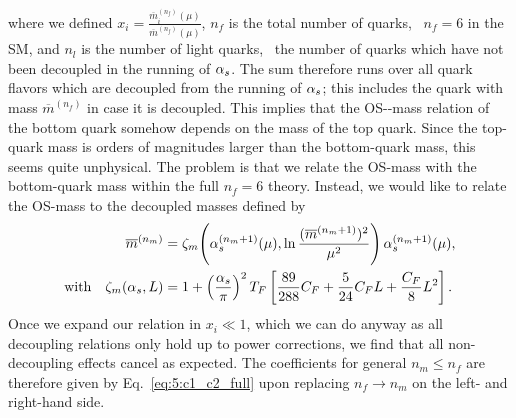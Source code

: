 where we defined $ x_i = \frac{\overline{m}^{(n_f)}_i(\mu)}{\overline{m}^{(n_f)}(\mu)}$, $n_f$ is the total number of quarks, \ie\ $n_f = 6$ in the \acs{SM}, and $n_l$ is the number of light quarks, \ie\ the number of quarks which have not been decoupled in the running of $\alpha_s$. The sum therefore runs over all quark flavors which are decoupled from the running of $\alpha_s$; this includes the quark with mass $\overline{m}^{(n_f)}$ in case it is decoupled. This implies that the \acs{OS}-\MS-mass relation of the bottom quark somehow depends on the mass of the top quark. Since the top-quark mass is orders of magnitudes larger than the bottom-quark mass, this seems quite unphysical. The problem is that we relate the \acs{OS}-mass with the bottom-quark mass within the full $n_f = 6$ theory. Instead, we would like to relate the \acs{OS}-mass to the decoupled masses defined by
\begin{equation}
\begin{split}
\overline{m}^{(n_m)} &= \zeta_m\!\left(\alpha_s^{(n_m + 1)}(\mu) , \ln \frac{(\overline{m}^{(n_m + 1)})^2}{\mu^2} \right) \alpha_s^{(n_m + 1)}(\mu), \\
\text{with} \quad \zeta_m (\alpha_s, L) &=  1 + \left(\frac{\alpha_s}{\pi}\right)^2 T_F \left[ \frac{89}{288} C_F  + \frac{5}{24} C_F L + \frac{C_F}{8} L^2 \right].
\end{split}
\end{equation}
Once we expand our relation in $x_i \ll 1$, which we can do anyway as all decoupling relations only hold up to power corrections, we find that all non-decoupling effects cancel as expected. The coefficients for general $n_m \le n_f$ are therefore given by Eq.~\eqref{eq:5:c1_c2_full} upon replacing $n_f \rightarrow n_m$ on the left- and right-hand side.

